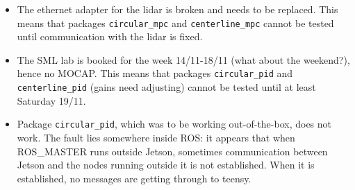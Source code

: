 \documentclass[oneside,12pt]{article}
\begin{document}
\begin{itemize}
  \item The ethernet adapter for the lidar is broken and needs to be replaced.
    This means that packages \texttt{circular\_mpc} and \texttt{centerline\_mpc}
    cannot be tested until communication with the lidar is fixed.
  \item The SML lab is booked for the week 14/11-18/11 (what about the weekend?),
    hence no MOCAP. This means that packages \texttt{circular\_pid} and
    \texttt{centerline\_pid} (gains need adjusting) cannot be tested until at
    least Saturday 19/11.
  \item Package \texttt{circular\_pid}, which was to be working out-of-the-box,
    does not work. The fault lies somewhere inside ROS: it appears that when
    ROS\_MASTER runs outside Jetson, sometimes communication between Jetson and the
    nodes running outside it is not established. When it is established, no
    messages are getting through to teensy.
\end{itemize}
\end{document}
